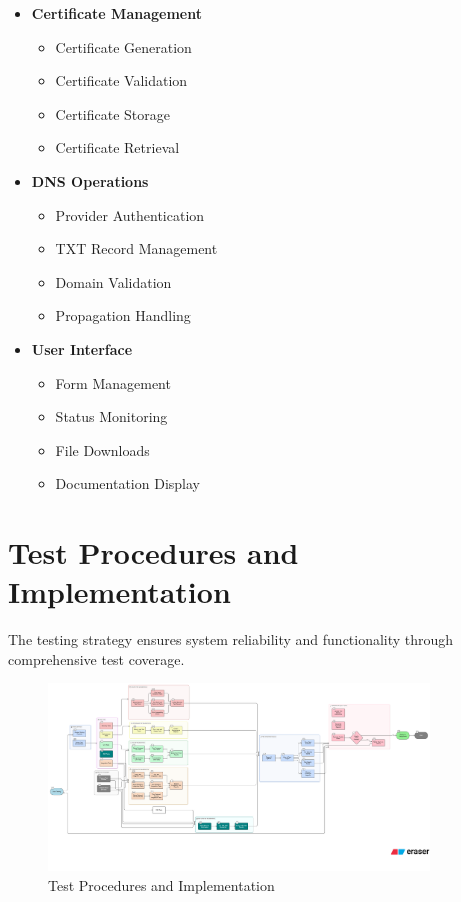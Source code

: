 \begin{itemize}
    \item \textbf{Certificate Management}
    \begin{itemize}
        \item Certificate Generation
        \item Certificate Validation
        \item Certificate Storage
        \item Certificate Retrieval
    \end{itemize}
    
    \item \textbf{DNS Operations}
    \begin{itemize}
        \item Provider Authentication
        \item TXT Record Management
        \item Domain Validation
        \item Propagation Handling
    \end{itemize}
    
    \item \textbf{User Interface}
    \begin{itemize}
        \item Form Management
        \item Status Monitoring
        \item File Downloads
        \item Documentation Display
    \end{itemize}
\end{itemize}

\section{Test Procedures and Implementation}

The testing strategy ensures system reliability and functionality through comprehensive test coverage.

\begin{figure}[h]
\centering
\includegraphics[width=0.9\textwidth]{diagram-images/3.16-test-procedures.png}
\caption{Test Procedures and Implementation}
\label{fig:test-procedures}
\end{figure}

